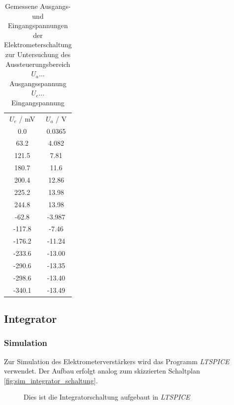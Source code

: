 \documentclass[12pt,english,ngerman]{scrartcl}
\begin{document}
\begin{table}[H]
  \caption{Gemessene Ausgangs- und Eingangspannungen der Elektrometerschaltung
  zur Untersuchung des Aussteuerungsbereich\\
  $U_a \dots$ Ausgangsspannung \\
  $U_e \dots$ Eingangspannung \\
  }
  \label{tab:mess_elektro_aussteurerung}
  \centering
    \begin{tabular}[c]{S|S}
      {$U_e$ / \si{\milli\volt}} & {$U_a$ / \si{\volt}} \\
      0.0 & 0.0365 \\
      63.2 & 4.082 \\
      121.5 & 7.81 \\
      180.7 & 11.6 \\
      200.4 & 12.86 \\
      225.2 & 13.98 \\
      244.8 & 13.98 \\
      -62.8 & -3.987 \\
      -117.8 & -7.46 \\
      -176.2 & -11.24 \\
      -233.6 & -13.00 \\
      -290.6 & -13.35 \\
      -298.6 & -13.40 \\
      -340.1 & -13.49 \\
    \end{tabular}
\end{table}



\subsection{Integrator}

\subsubsection{Simulation}
Zur Simulation des Elektrometerverstärkers wird das Programm
\textit{LTSPICE} verwendet. Der Aufbau erfolgt analog zum skizzierten
Schaltplan \autoref{fig:sim_integrator_schaltung}. 

\begin{figure}[H]
  \centering
  \caption{Dies ist die Integratorschaltung aufgebaut in \textit{LTSPICE}}
  \label{fig:sim_integrator_schaltung}
\end{figure}
\end{document}
